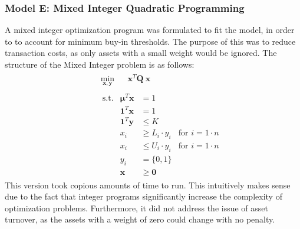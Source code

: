 \documentclass[10pt]{article}
\begin{document}
\subsubsection{Model E: Mixed Integer Quadratic Programming}
\label{sec:modelE}
A mixed integer optimization program was formulated to fit the model, in order to  to account for minimum buy-in thresholds. The purpose of this was to reduce transaction costs, as only assets with a small weight would be ignored. The structure of the Mixed Integer problem is as follows:
\[
\begin{aligned}
&\begin{aligned}
    & \min_{\bm{x,y}}     &&\bm{x}^T \bm{Q}\ \bm{x}
\end{aligned} \\
&\begin{aligned}
    &\ \mathrm{s.t.}        & \bm{\mu}^T \bm{x} &= 1 \\
    &  &\bm{1}^T \bm{x} &= 1 \\
        &  & \bm{1}^T \bm{y} & \leq K \\
    &                   & x_i &\geq L_i \cdot y_i & \text{for } i = 1 \cdot n\\
        &                   & x_i &\leq U_i \cdot y_i & \text{for } i = 1 \cdot n\\
    &                   & y_i &= \{0, 1\} \\
        &                   & \bm{x} &\geq \bm{0}
\end{aligned}
\end{aligned}
\]
This version took copious amounts of time to run. This intuitively makes sense due to the fact that integer programs significantly increase the complexity of optimization problems. Furthermore, it did not address the issue of asset turnover, as the assets with a weight of zero could change with no penalty.
\end{document}

